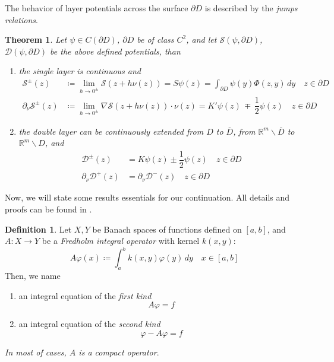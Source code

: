 \documentclass[10pt, a4paper, twoside, openright]{book}
\theoremstyle{definition}
\newtheorem{definition}[subsection]{Definition}
\theoremstyle{plain}
\newtheorem{theorem}[subsection]{Theorem}
\theoremstyle{plain}
\theoremstyle{plain}
\theoremstyle{plain}
\theoremstyle{plain}
\theoremstyle{plain}
\theoremstyle{plain}
\theoremstyle{plain}
\let\phi\varphi
\begin{document}
The behavior of layer potentials across the surface $\partial D$ is described by the \emph{jumps relations}.
\begin{theorem}
 Let $\psi\in C(\partial D)$, $\partial D$ be of class $C^2$, and let $\mathcal{S}(\psi,\partial D)$, $\mathcal{D}(\psi,\partial D)$ be the above defined potentials, than
 \begin{enumerate}
  \item the single layer is continuous and 
  \begin{subequations}
  \begin{align}
   \mathcal{S}^\pm(z) &\coloneqq\lim_{h\to 0^\pm}\mathcal{S}(z+h\nu(z)) = S\psi(z)=\int_{\partial D}\psi(y)\Phi(z,y)\,dy \quad z\in\partial D \label{eq:single-pm-0}\\
   \partial_\nu\mathcal{S}^\pm(z) &\coloneqq \lim_{h\to0^\pm} \nabla\mathcal{S}(z+h\nu(z))\cdot\nu(z) =  K'\psi(z) \,\mp\,\dfrac{1}{2}\psi(z) \quad z\in\partial D\label{eq:single-pm-1}
  \end{align}
 \end{subequations}
 \item the double layer can be continuously extended from $D$ to $\overline{D}$, from $\mathbb{R}^m\backslash \overline{D}$ to $\mathbb{R}^m\backslash D$, and
  \begin{subequations}
  \begin{align}
   \mathcal{D}^\pm(z) &= K\psi(z) \pm\dfrac{1}{2}\psi(z)\quad z\in\partial D \label{eq:double-pm-0}\\
   \partial_\nu\mathcal{D}^+(z) &= \partial_\nu\mathcal{D}^-(z) \quad z\in\partial D\label{eq:double-pm-1}
  \end{align}
  \end{subequations}
 \end{enumerate}
\end{theorem}
Now, we will state some results essentials for our continuation.
All details and proofs can be found in \cite{kress:book}.
\begin{definition}
 Let $X,Y$ be Banach spaces of functions defined on $[a,b]$, and $A:X\to Y$ be a \emph{Fredholm integral operator} with kernel $k(x,y)$:
 \begin{equation}
  A\phi(x)\coloneqq\int_a^b k(x,y)\phi(y)\,dy\quad x\in[a,b]
 \end{equation}
 Then, we name
 \begin{enumerate}
  \item an integral equation of the \emph{first kind}
   \begin{equation}
    A\phi=f
   \end{equation}
  \item an integral equation of the \emph{second kind}
   \begin{equation}
    \phi - A\phi=f
   \end{equation}
 \end{enumerate}
\emph{In most of cases, $A$ is a compact operator}.
\end{definition}
\end{document}
